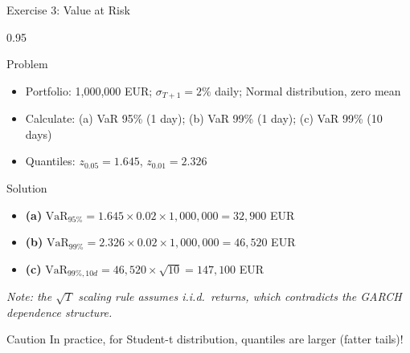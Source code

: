 \documentclass[9pt, aspectratio=169, t]{beamer}
\begin{document}
\begin{frame}{Exercise 3: Value at Risk}
    \begin{cminipage}{0.95\textwidth}
    \begin{alertblock}{Problem}
        \begin{itemize}\setlength{\itemsep}{0pt}
            \item Portfolio: 1,000,000 EUR; $\sigma_{T+1} = 2\%$ daily; Normal distribution, zero mean
            \item Calculate: (a) VaR 95\% (1 day); (b) VaR 99\% (1 day); (c) VaR 99\% (10 days)
            \item Quantiles: $z_{0.05} = 1.645$, $z_{0.01} = 2.326$
        \end{itemize}
    \end{alertblock}

    \vspace{0.2cm}
    \begin{exampleblock}{Solution}
        \begin{itemize}\setlength{\itemsep}{0pt}
            \item \textbf{(a)} $\text{VaR}_{95\%} = 1.645 \times 0.02 \times 1{,}000{,}000 = 32{,}900$ EUR
            \item \textbf{(b)} $\text{VaR}_{99\%} = 2.326 \times 0.02 \times 1{,}000{,}000 = 46{,}520$ EUR
            \item \textbf{(c)} $\text{VaR}_{99\%, 10d} = 46{,}520 \times \sqrt{10} = 147{,}100$ EUR
        \end{itemize}
    \end{exampleblock}

    \textit{Note: the $\sqrt{T}$ scaling rule assumes i.i.d.\ returns, which contradicts the GARCH dependence structure.}

    \begin{alertblock}{Caution}
        In practice, for Student-t distribution, quantiles are larger (fatter tails)!
    \end{alertblock}
    \end{cminipage}
\end{frame}
\end{document}
